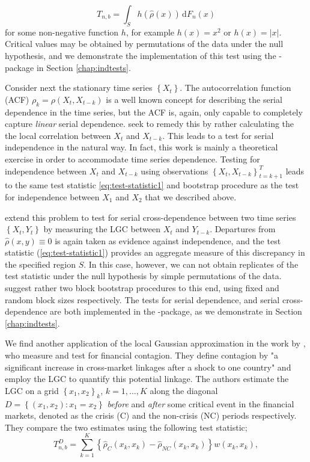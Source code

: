 \begin{equation}
T_{n,b} = \int_S h\left(\widehat \rho\left(x\right) \right) \,\textrm{d}F_n(x)
\label{eq:test-statistic1}
\end{equation}
for some non-negative function $h$, for example $h\left(x\right) = x^2$ or $h\left(x\right) = |x|$. Critical values may be obtained by permutations of the data under the null hypothesis, and we demonstrate the implementation of this test using the -package in Section \ref{chap:indtests}.

Consider next the stationary time series $\left\{X_t\right\}$. The autocorrelation function (ACF) $\rho_k = \rho\left(X_t, X_{t-k}\right)$ is a well known concept for describing the serial dependence in the time series, but the ACF is, again, only capable to completely capture \emph{linear} serial dependence. \cite{laca:tjos:2017} seek to remedy this by rather calculating the the local correlation between $X_t$ and $X_{t-k}$. This leads to a test for serial independence in the natural way. In fact, this work is mainly a theoretical exercise in order to accommodate time series dependence. Testing for independence between $X_t$ and $X_{t-k}$ using observations $\left\{X_t, X_{t-k}\right\}_{t = k+1}^T$ leads to the same test statistic \eqref{eq:test-statistic1} and bootstrap procedure as the test for independence between $X_1$ and $X_2$ that we described above. 

\cite{laca:tjos:2018} extend this problem to test for serial cross-dependence between two time series $\left\{X_t, Y_t\right\}$ by measuring the LGC between $X_t$ and $Y_{t-k}$. Departures from $\widehat\rho\left(x,y\right) \equiv 0$ is again taken as evidence against independence, and the test statistic (\ref{eq:test-statistic1}) provides an aggregate measure of this discrepancy in the specified region $S$. In this case, however, we can not obtain replicates of the test statistic under the null hypothesis by simple permutations of the data. \cite{laca:tjos:2018} suggest rather two block bootstrap procedures to this end, using fixed and random block sizes respectively. The tests for serial dependence, and serial cross-dependence are both implemented in the -package, as we demonstrate in Section \ref{chap:indtests}.

We find another application of the local Gaussian approximation in the work by \cite{stov:tjos:huft:2014}, who measure and test for financial contagion. They define contagion by "a significant increase in cross-market linkages after a shock to one country" \citep[p. 2223]{forb:rigo:2002} and employ the LGC to quantify this potential linkage. The authors estimate the LGC on a grid $\left\{x_1, x_2\right\}_k$, $k=1,\ldots,K$ along the diagonal $D=\left\{\left(x_1,x_2\right): x_1 = x_2\right\}$ \emph{before} and \emph{after} some critical event in the financial markets, denoted as the crisis (C) and the non-crisis (NC) periods respectively. They compare the two estimates using the following test statistic; 
$$T_{n,b}^D = \sum_{k=1}^K \left\{\widehat\rho_C\left(x_k, x_k\right) - \widehat\rho_{NC}\left(x_k, x_k\right) \right\}w\left(x_k,x_k\right),$$

